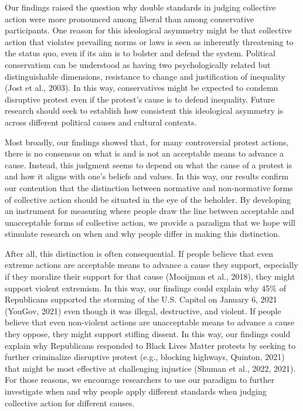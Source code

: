 \documentclass[12pt, letterpaper]{article}
\begin{document}
Our findings raised the question why double standards in judging
collective action were more pronounced among liberal than among
conservative participants. One reason for this ideological asymmetry
might be that collective action that violates prevailing norms or laws
is seen as inherently threatening to the status quo, even if its aim is
to bolster and defend the system. Political conservatism can be
understood as having two psychologically related but distinguishable
dimensions, resistance to change and justification of inequality (Jost
et al., 2003). In this way, conservatives might be expected to condemn
disruptive protest even if the protest's cause is to defend inequality.
Future research should seek to establish how consistent this ideological
asymmetry is across different political causes and cultural contexts.

Most broadly, our findings showed that, for many controversial protest
actions, there is no consensus on what is and is not an acceptable means
to advance a cause. Instead, this judgment seems to depend on what the
cause of a protest is and how it aligns with one's beliefs and values.
In this way, our results confirm our contention that the distinction
between normative and non-normative forms of collective action should be
situated in the eye of the beholder. By developing an instrument for
measuring where people draw the line between acceptable and unacceptable
forms of collective action, we provide a paradigm that we hope will
stimulate research on when and why people differ in making this
distinction.

After all, this distinction is often consequential. If people believe
that even extreme actions are acceptable means to advance a cause they
support, especially if they moralize their support for that cause
(Mooijman et al., 2018), they might support violent extremism. In this
way, our findings could explain why 45\% of Republicans supported the
storming of the U.S. Capitol on January 6, 2021 (YouGov, 2021) even
though it was illegal, destructive, and violent. If people believe that
even non-violent actions are unacceptable means to advance a cause they
oppose, they might support stifling dissent. In this way, our findings
could explain why Republicans responded to Black Lives Matter protests
by seeking to further criminalize disruptive protest (e.g., blocking
highways, Quinton, 2021) that might be most effective at challenging
injustice (Shuman et al., 2022, 2021). For those reasons, we encourage
researchers to use our paradigm to further investigate when and why
people apply different standards when judging collective action for
different causes.
\end{document}

